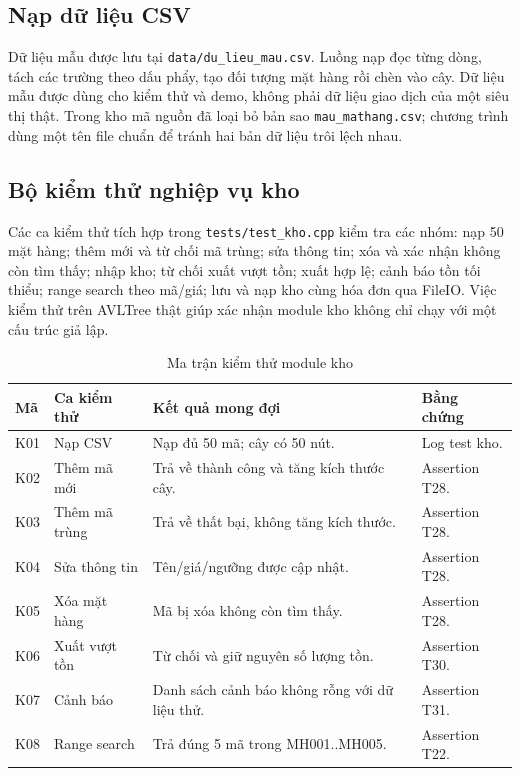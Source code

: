 \subsection{Nạp dữ liệu CSV}
Dữ liệu mẫu được lưu tại \texttt{data/du\_lieu\_mau.csv}. Luồng nạp đọc từng dòng, tách các trường theo dấu phẩy, tạo đối tượng mặt hàng rồi chèn vào cây. Dữ liệu mẫu được dùng cho kiểm thử và demo, không phải dữ liệu giao dịch của một siêu thị thật. Trong kho mã nguồn đã loại bỏ bản sao \texttt{mau\_mathang.csv}; chương trình dùng một tên file chuẩn để tránh hai bản dữ liệu trôi lệch nhau.

\subsection{Bộ kiểm thử nghiệp vụ kho}
Các ca kiểm thử tích hợp trong \texttt{tests/test\_kho.cpp} kiểm tra các nhóm: nạp 50 mặt hàng; thêm mới và từ chối mã trùng; sửa thông tin; xóa và xác nhận không còn tìm thấy; nhập kho; từ chối xuất vượt tồn; xuất hợp lệ; cảnh báo tồn tối thiểu; range search theo mã/giá; lưu và nạp kho cùng hóa đơn qua FileIO. Việc kiểm thử trên AVLTree thật giúp xác nhận module kho không chỉ chạy với một cấu trúc giả lập.

\begin{table}[H]
\centering
\caption{Ma trận kiểm thử module kho}
\label{tab:test_kho}
\small
\begin{tabular}{@{}p{1.1cm}p{4cm}p{6.2cm}p{2.5cm}@{}}
\toprule
\textbf{Mã} & \textbf{Ca kiểm thử} & \textbf{Kết quả mong đợi} & \textbf{Bằng chứng} \\
\midrule
K01 & Nạp CSV & Nạp đủ 50 mã; cây có 50 nút. & Log test kho. \\
K02 & Thêm mã mới & Trả về thành công và tăng kích thước cây. & Assertion T28. \\
K03 & Thêm mã trùng & Trả về thất bại, không tăng kích thước. & Assertion T28. \\
K04 & Sửa thông tin & Tên/giá/ngưỡng được cập nhật. & Assertion T28. \\
K05 & Xóa mặt hàng & Mã bị xóa không còn tìm thấy. & Assertion T28. \\
K06 & Xuất vượt tồn & Từ chối và giữ nguyên số lượng tồn. & Assertion T30. \\
K07 & Cảnh báo & Danh sách cảnh báo không rỗng với dữ liệu thử. & Assertion T31. \\
K08 & Range search & Trả đúng 5 mã trong MH001..MH005. & Assertion T22. \\
\bottomrule
\end{tabular}
\end{table}

